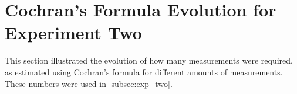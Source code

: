 \section{Cochran's Formula Evolution for Experiment Two}\label{app:cockh_exp}

This section illustrated the evolution of how many measurements were required, as estimated using Cochran's formula for different amounts of measurements. These numbers were used in \cref{subsec:exp_two}.


